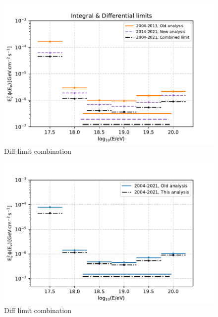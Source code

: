 \begin{figure}[t!]
  \centering
  \includegraphics[width=14.5cm]{thesis_figures/ExpLimits/Integ_DiffLimit_comp_combined_new_sim_optim.pdf}
  \caption{Diff limit combination}
  \label{fig:Limit_comp_2}
\end{figure}

\begin{figure}[t!]
  \centering
  \includegraphics[width=14.5cm]{thesis_figures/ExpLimits/Integ_DiffLimit_comp_combined_new_sim_optim_3.pdf}
  \caption{Diff limit combination}
  \label{fig:Limit_comp_3}
\end{figure}


